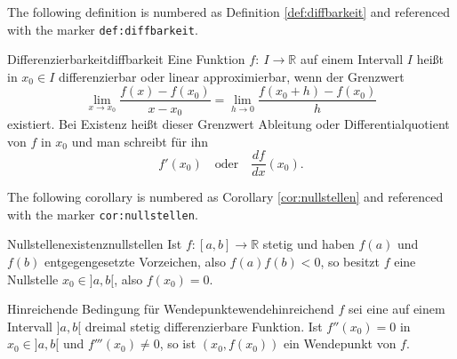 \begin{dispExample}
The following definition is numbered as Definition \ref{def:diffbarkeit} and
referenced with the marker \texttt{def:diffbarkeit}.\bigskip

\begin{Definition}{Differenzierbarkeit}{diffbarkeit}
  Eine Funktion $f:~I\to\mathbb{R}$ auf einem Intervall $I$ hei\ss{}t in
  $x_0\in I$ differenzierbar oder linear approximierbar,
  wenn der Grenzwert
  \begin{equation*}
  \lim\limits_{x\to x_0}\frac{f(x)-f(x_0)}{x-x_0}=
  \lim\limits_{h\to 0}\frac{f(x_0+h)-f(x_0)}{h}
  \end{equation*}
  existiert. Bei Existenz hei\ss{}t dieser Grenzwert Ableitung
  oder Differentialquotient von $f$ in $x_0$ und man
  schreibt f\"{u}r ihn
  \begin{equation*}
  f'(x_0)\quad\text{oder}\quad\frac{df}{dx}(x_0).
  \end{equation*}
\end{Definition}
\end{dispExample}


\begin{dispExample}
The following corollary is numbered as Corollary \ref{cor:nullstellen} and
referenced with the marker \texttt{cor:nullstellen}.\bigskip

\begin{Corollary}{Nullstellenexistenz}{nullstellen}
  Ist $f:[a,b]\to\mathbb{R}$ stetig und haben $f(a)$ und $f(b)$ entgegengesetzte
  Vorzeichen, also $f(a)f(b)<0$, so besitzt $f$ eine Nullstelle $x_0\in]a,b[$,
  also $f(x_0)=0$.
\end{Corollary}
\end{dispExample}


\begin{dispExample}
\begin{Theorem}[boxrule=2mm,toptitle=-1.5mm,bottomtitle=-1.5mm]{%
    Hinreichende Bedingung f\"{u}r Wendepunkte}{wendehinreichend}%
  $f$ sei eine auf einem Intervall $]a,b[$ dreimal stetig differenzierbare Funktion.
  Ist $f''(x_0)=0$ in $x_0\in]a,b[$ und $f'''(x_0)\ne 0$, so ist
  $(x_0,f(x_0))$ ein Wendepunkt von $f$.
\end{Theorem}
\end{dispExample}

